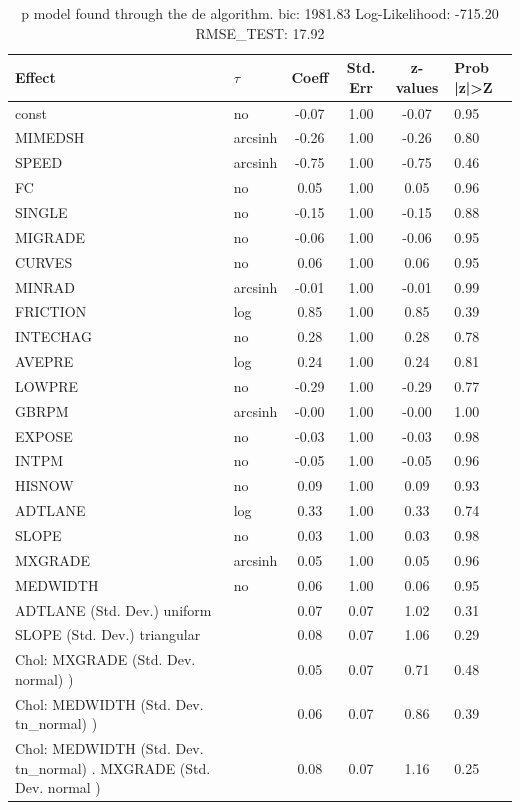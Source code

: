\begin{table}
	\caption{p model found through the de algorithm. bic: 1981.83 Log-Likelihood: -715.20 RMSE_TEST: 17.92}
	\begin{center}
		\begin{tabular}{|l|l|c|c|c|l|}
			\hline
			Effect & $\tau$ & Coeff & Std. Err & z-values & Prob |z|>Z \\
			\hline
			const & no & -0.07 & 1.00 & -0.07 & 0.95 \\
			\hline
			MIMEDSH & arcsinh & -0.26 & 1.00 & -0.26 & 0.80 \\
			\hline
			SPEED & arcsinh & -0.75 & 1.00 & -0.75 & 0.46 \\
			\hline
			FC & no & 0.05 & 1.00 & 0.05 & 0.96 \\
			\hline
			SINGLE & no & -0.15 & 1.00 & -0.15 & 0.88 \\
			\hline
			MIGRADE & no & -0.06 & 1.00 & -0.06 & 0.95 \\
			\hline
			CURVES & no & 0.06 & 1.00 & 0.06 & 0.95 \\
			\hline
			MINRAD & arcsinh & -0.01 & 1.00 & -0.01 & 0.99 \\
			\hline
			FRICTION & log & 0.85 & 1.00 & 0.85 & 0.39 \\
			\hline
			INTECHAG & no & 0.28 & 1.00 & 0.28 & 0.78 \\
			\hline
			AVEPRE & log & 0.24 & 1.00 & 0.24 & 0.81 \\
			\hline
			LOWPRE & no & -0.29 & 1.00 & -0.29 & 0.77 \\
			\hline
			GBRPM & arcsinh & -0.00 & 1.00 & -0.00 & 1.00 \\
			\hline
			EXPOSE & no & -0.03 & 1.00 & -0.03 & 0.98 \\
			\hline
			INTPM & no & -0.05 & 1.00 & -0.05 & 0.96 \\
			\hline
			HISNOW & no & 0.09 & 1.00 & 0.09 & 0.93 \\
			\hline
			ADTLANE & log & 0.33 & 1.00 & 0.33 & 0.74 \\
			\hline
			SLOPE & no & 0.03 & 1.00 & 0.03 & 0.98 \\
			\hline
			MXGRADE & arcsinh & 0.05 & 1.00 & 0.05 & 0.96 \\
			\hline
			MEDWIDTH & no & 0.06 & 1.00 & 0.06 & 0.95 \\
			\hline
			ADTLANE (Std. Dev.) uniform &  & 0.07 & 0.07 & 1.02 & 0.31 \\
			\hline
			SLOPE (Std. Dev.) triangular &  & 0.08 & 0.07 & 1.06 & 0.29 \\
			\hline
			 Chol: MXGRADE (Std. Dev. normal) ) &  & 0.05 & 0.07 & 0.71 & 0.48 \\
			\hline
			 Chol: MEDWIDTH (Std. Dev. tn_normal) ) &  & 0.06 & 0.07 & 0.86 & 0.39 \\
			\hline
			 Chol: MEDWIDTH (Std. Dev. tn_normal) . MXGRADE (Std. Dev.   normal ) &  & 0.08 & 0.07 & 1.16 & 0.25 \\
			\hline
		\end{tabular}
	\end{center}
\end{table}